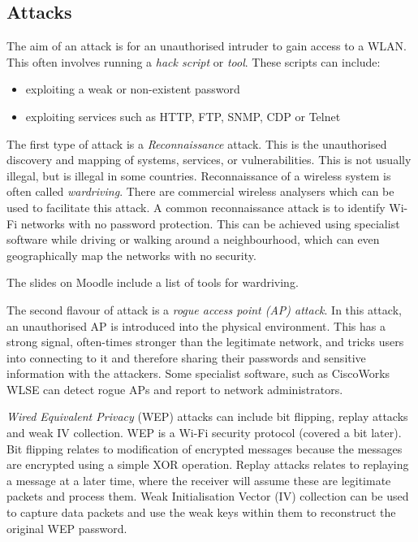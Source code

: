 \subsection{Attacks}
The aim of an attack is for an unauthorised intruder to gain access to a WLAN. This often involves running a \textit{hack script} or \textit{tool}. These scripts can include:
\begin{itemize}
    \item exploiting a weak or non-existent password
    \item exploiting services such as HTTP, FTP, SNMP, CDP or Telnet
\end{itemize}

The first type of attack is a \textit{Reconnaissance} attack. This is the unauthorised discovery and mapping of systems, services, or vulnerabilities. This is not usually illegal, but is illegal in some countries. Reconnaissance of a wireless system is often called \textit{wardriving}. There are commercial wireless analysers which can be used to facilitate this attack. A common reconnaissance attack is to identify Wi-Fi networks with no password protection. This can be achieved using specialist software while driving or walking around a neighbourhood, which can even geographically map the networks with no security.

\begin{extlink}
The slides on Moodle include a list of tools for wardriving. 
\end{extlink}

The second flavour of attack is a \textit{rogue access point (AP) attack}. In this attack, an unauthorised AP is introduced into the physical environment. This has a strong signal, often-times stronger than the legitimate network, and tricks users into connecting to it and therefore sharing their passwords and sensitive information with the attackers. Some specialist software, such as CiscoWorks WLSE can detect rogue APs and report to network administrators.

\textit{Wired Equivalent Privacy} (WEP) attacks can include bit flipping, replay attacks and weak IV collection. WEP is a Wi-Fi security protocol (covered a bit later). Bit flipping relates to modification of encrypted messages because the messages are encrypted using a simple XOR operation. Replay attacks relates to replaying a message at a later time, where the receiver will assume these are legitimate packets and process them. Weak Initialisation Vector (IV) collection can be used to capture data packets and use the weak keys within them to reconstruct the original WEP password. 


